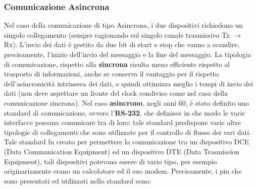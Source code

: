 \subsubsection{Comunicazione Asincrona}
Nel caso della comunicazione di tipo Asincrona, i due dispositivi richiedono un singolo collegamento (sempre ragionando sul singolo canale trasmissivo Tx $\rightarrow$ Rx).
L'invio dei dati è gestito da due bit di start e stop che vanno a scandire, precisamente, l'inizio dell'invio del messaggio e la fine del messaggio.
La tipologia di comunicazione, rispetto alla \textbf{sincrona} risulta meno efficiente rispetto al trasporto di informazioni, anche se conserva il vantaggio per il rispetto dell'asincronicità intrinseca dei dati, e quindi ottimizza meglio i tempi di invio dei dati (non deve aspettare un fronte del clock condiviso come nel caso della comunicazione sincrona).
Nel caso \textbf{asincrono}, negli anni 60, è stato definito uno standard di comunicazione, ovvero l'\textbf{RS-232}, che definisce in che modo le varie interfacce possano comunicare tra di loro: tale standard predispone varie altre tipologie di collegamenti che sono utilizzate per il controllo di flusso dei vari dati. Tale standard fu creato per permettere la comunicazione tra un dispositivo DCE (Data Communication Equipment) ed un dispositivo DTE (Data Trasmission Equipment), tali dispositivi potevano essere di vario tipo, per esempio originariamente erano un calcolatore ed il suo modem. Precisamente, i pin che sono presentati ed utilizzati nello standard sono:

